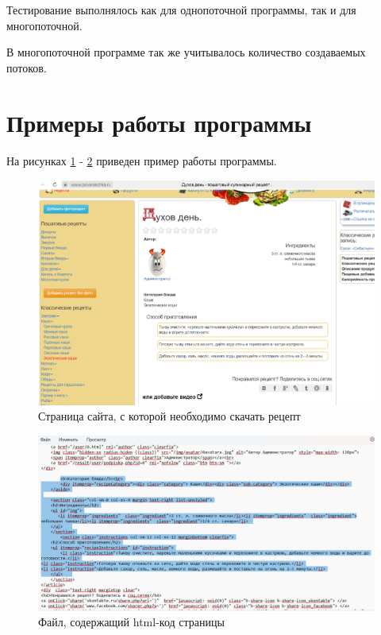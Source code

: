 \documentclass{article}
\begin{document}
Тестирование выполнялось как для однопоточной программы, так и для многопоточной.

В многопоточной программе так же учитывалось количество создаваемых потоков.

\clearpage\section{Примеры работы программы}
На рисунках \ref{pict:in} - \ref{pict:out} приведен пример работы программы.
	
\begin{figure}[h]
	\centering
	\includegraphics[scale=0.4]{tools/in.png}
	\caption{Страница сайта, с которой необходимо скачать рецепт}
	\label{pict:in}
\end{figure}

\begin{figure}[h]
	\centering
	\includegraphics[scale=0.4]{tools/out.png}
	\caption{Файл, содержащий html-код страницы}
	\label{pict:out}
\end{figure}
\end{document}
